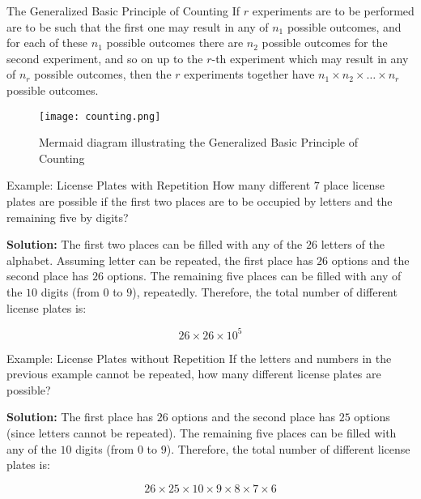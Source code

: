 \begin{definitionboxbreak}{The Generalized Basic Principle of Counting}
    If \(r\) experiments are to be performed are to be such that the first one may result in any of \(n_1\) possible outcomes, and for each of these \(n_{1}\) possible outcomes there are \(n_2\) possible outcomes for the second experiment, and so on up to the \(r\)-th experiment which may result in any of \(n_r\) possible outcomes, then the \(r\) experiments together have \(n_1 \times n_2 \times \ldots \times n_r\) possible outcomes.
\end{definitionboxbreak}


\begin{figure}[H]
    \centering
    \texttt{[image: counting.png]}
    \caption{Mermaid diagram illustrating the Generalized Basic Principle of Counting}
    \label{fig:counting}
\end{figure}



\begin{exampleboxbreak}{Example: License Plates with Repetition}
    How many different \(7\) place license plates are possible if the first two places are to be occupied by letters and the remaining five by digits?

    \textbf{Solution:} The first two places can be filled with any of the \(26\) letters of the alphabet. Assuming letter can be repeated, the first place has \(26\) options and the second place has \(26\) options. The remaining five places can be filled with any of the \(10\) digits (from \(0\) to \(9\)), repeatedly. Therefore, the total number of different license plates is:

    \[
    26 \times 26 \times 10^5
    \]
\end{exampleboxbreak}

\begin{exampleboxbreak}{Example: License Plates without Repetition}
    If the letters and numbers in the previous example cannot be repeated, how many different license plates are possible?

    \textbf{Solution:} The first place has \(26\) options and the second place has \(25\) options (since letters cannot be repeated). The remaining five places can be filled with any of the \(10\) digits (from \(0\) to \(9\)). Therefore, the total number of different license plates is:

    \[
    26 \times 25 \times 10 \times 9 \times 8 \times 7 \times 6
    \]
\end{exampleboxbreak}

